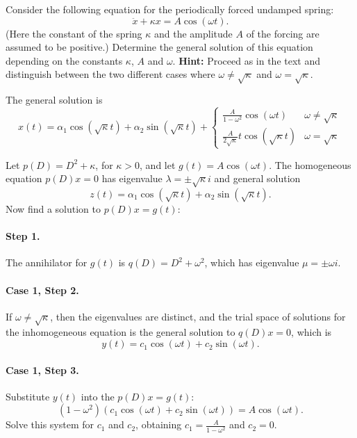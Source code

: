 \documentclass{ximera}
\begin{document}
\EXER

\TEXER


\begin{exercise} \label{c12.5.1}
Consider the following equation for the periodically forced
undamped spring:
\[
\ddot x + \kappa x = A\cos(\omega t).
\]
(Here the constant of the spring $\kappa$ and the amplitude $A$ of the
forcing are assumed to be positive.)  Determine the general solution of
this equation depending on the constants $\kappa$, $A$ and $\omega $.
{\bf Hint:} Proceed as in the text and distinguish between the two
different cases where $\omega \not=\sqrt{\kappa}$ and 
$\omega =\sqrt{\kappa}$.

\begin{solution}
\ans The general solution is
\[
x(t) = \alpha_1\cos(\sqrt{\kappa}t) + \alpha_2\sin(\sqrt{\kappa}t)
+ \left\{
\begin{array}{lr} \frac{A}{1 - \omega^2}\cos(\omega t) &
\omega \neq \sqrt{\kappa} \\
\frac{A}{2\sqrt{\kappa}}t\cos(\sqrt{\kappa}t) &
\omega = \sqrt{\kappa}
\end{array}\right.
\]

\soln Let $p(D) = D^2 + \kappa$, for $\kappa > 0$, and let $g(t) =
A\cos(\omega t)$.  The homogeneous equation $p(D)x = 0$ has eigenvalue
$\lambda = \pm \sqrt{\kappa} i$ and general solution
\[
z(t) = \alpha_1\cos(\sqrt{\kappa}t) + \alpha_2\sin(\sqrt{\kappa}t).
\]
Now find a solution to $p(D)x = g(t)$:

\paragraph{Step 1.} The annihilator for $g(t)$ is $q(D) =
D^2 + \omega^2$, which has eigenvalue $\mu = \pm \omega i$.

\paragraph{Case 1, Step 2.} If $\omega \neq \sqrt{\kappa}$, then the
eigenvalues are distinct, and the trial space of solutions for the
inhomogeneous equation is the general solution to $q(D)x = 0$, which
is
\[
y(t) = c_1\cos(\omega t) + c_2\sin(\omega t).
\]
\paragraph{Case 1, Step 3.} Substitute $y(t)$ into the $p(D)x = g(t)$:
\[
(1 - \omega^2)(c_1\cos(\omega t) + c_2\sin(\omega t)) = A\cos(\omega t).
\]
Solve this system for $c_1$ and $c_2$, obtaining $c_1 = \frac{A}
{1 - \omega^2}$ and $c_2 = 0$.


\end{solution}
\end{exercise}
\end{document}
